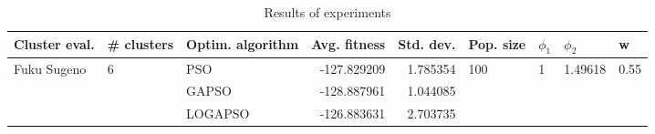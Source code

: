 \begin{table}
\centering
\caption{Results of experiments}
\begin{tabular}{lllrrllll}
\toprule
               Cluster eval. &        \# clusters & Optim. algorithm &  Avg. fitness &  Std. dev. &            Pop. size &         $\phi_{1}$ &               $\phi_{2}$ &                     w \\
\midrule
\multirow{3}{*}{Fuku Sugeno} & \multirow{3}{*}{6} &              PSO &   -127.829209 &   1.785354 & \multirow{3}{*}{100} & \multirow{3}{*}{1} & \multirow{3}{*}{1.49618} & \multirow{3}{*}{0.55} \\
                             &                    &            GAPSO &   -128.887961 &   1.044085 &                      &                    &                          &                       \\
                             &                    &          LOGAPSO &   -126.883631 &   2.703735 &                      &                    &                          &                       \\
\bottomrule
\end{tabular}
\end{table}
